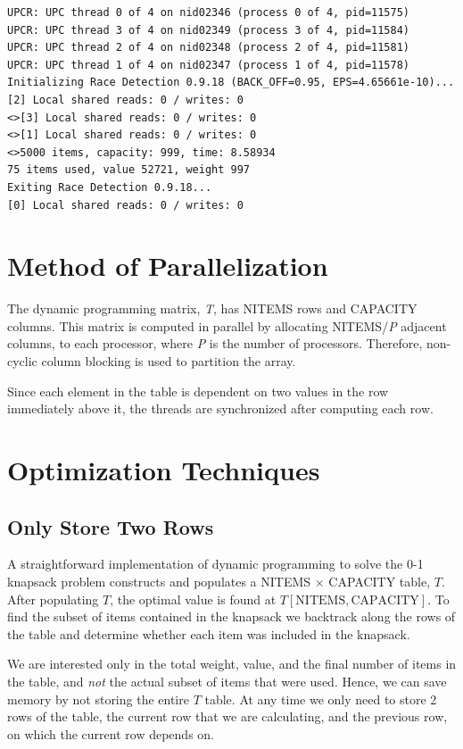\documentclass[11pt]{article} %
\begin{document}
{\tiny
\begin{lstlisting}
UPCR: UPC thread 0 of 4 on nid02346 (process 0 of 4, pid=11575)
UPCR: UPC thread 3 of 4 on nid02349 (process 3 of 4, pid=11584)
UPCR: UPC thread 2 of 4 on nid02348 (process 2 of 4, pid=11581)
UPCR: UPC thread 1 of 4 on nid02347 (process 1 of 4, pid=11578)
Initializing Race Detection 0.9.18 (BACK_OFF=0.95, EPS=4.65661e-10)...
[2] Local shared reads: 0 / writes: 0
<>[3] Local shared reads: 0 / writes: 0
<>[1] Local shared reads: 0 / writes: 0
<>5000 items, capacity: 999, time: 8.58934
75 items used, value 52721, weight 997
Exiting Race Detection 0.9.18...
[0] Local shared reads: 0 / writes: 0
\end{lstlisting}
}

\section{Method of Parallelization}

The dynamic programming matrix, \emph{T}, has NITEMS rows and CAPACITY columns. This matrix is computed in parallel by allocating NITEMS/\emph{P} adjacent columns, to each processor, where \emph{P} is the number of processors. Therefore, non-cyclic column blocking is used to partition the array.

Since each element in the table is dependent on two values in the row immediately above it, the threads are synchronized after computing each row.

\section{Optimization Techniques}

\subsection{Only Store Two Rows}
A straightforward implementation of dynamic programming to solve the 0-1 knapsack problem constructs and populates a NITEMS $\times$ CAPACITY table, $T$. After populating $T$, the optimal value is found at $T[\text{NITEMS}, \text{CAPACITY}]$. To find the subset of items contained in the knapsack we backtrack along the rows of the table and determine whether each item was included in the knapsack. 

We are interested only in the total weight, value, and the final number of items in the table, and \emph{not} the actual subset of items that were used. Hence, we can save memory by not storing the entire $T$ table. At any time we only need to store 2 rows of the table, the current row that we are calculating, and the previous row, on which the current row depends on.
\end{document}
